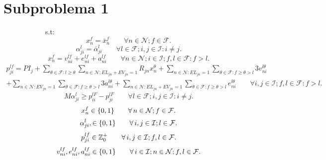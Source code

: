 \documentclass[authoryear,preprint,review,12pt]{elsarticle}
\begin{document}
\section{Subproblema 1}
~~~~~~~~~~~~s.t:
\begin{equation}\label{x_sp1}
x_n^f= \bar{x}_n^f \qquad \forall n \in \mathcal{N}; f \in \mathcal{F}.
\end{equation}
\begin{equation}\label{alpha-sp1}
\alpha_{ji}^l = \bar{\alpha}_{ji}^l \qquad \forall l \in \mathcal{F}; i,j \in \mathcal{I}: i \neq j.
\end{equation}
\begin{equation}\label{ecua7}
 x_n^f = v_{ni}^{lf} + e_{ni}^{lf} + a_{ni}^{lf} \qquad \forall n \in \mathcal{N}; i \in \mathcal{I}; f,l \in \mathcal{F}: f > l.
\end{equation}
\begin{multline}\label{ecua9}
  p_{ji}^{lf} = PI_j + \sum_{\theta \in  \mathcal{F}: l \geq \theta}\sum\limits_{n \in \mathcal{N}: EL_{jn}+EV_{jn}=1}R_{jn}x_n^\theta + \sum\limits_{n \in \mathcal{N}: EL_{jn}=1}\sum\limits_{\theta \in \mathcal{F}: f \geq \theta > l}3v_{ni}^{l\theta} \\
  + \sum\limits_{n \in \mathcal{N}: EV_{jn}=1}\sum\limits_{\theta \in \mathcal{F}: f \geq \theta > l}3a_{ni}^{l\theta} + \sum\limits_{n \in \mathcal{N}: EL_{jn}+ EV_{jn}=1}\sum\limits_{\theta \in \mathcal{F}: f \geq \theta > l}e_{ni}^{l\theta} \qquad \forall i,j \in \mathcal{I}; f,l \in \mathcal{F}: f > l.
\end{multline}
\begin{equation}\label{ecua11}
   M\alpha_{ji}^l \geq p_{ii}^{lF} - p_{ji}^{lF} \qquad \forall l \in \mathcal{F}; i,j \in \mathcal{I}: i \neq j.
\end{equation}
\begin{equation}\label{ecua29_sp1}
  x_n^f \in\{0,1\} \qquad \forall\, n \in \mathcal{N}; f \in \mathcal{F}.\\
\end{equation}
\begin{equation}\label{ecua33_sp1}
  \alpha_{ji}^l, \in \{0,1\} \qquad \forall\, i,j \in \mathcal{I}; l \in \mathcal{F}.\\
\end{equation}
\begin{equation}\label{ecua31}
  p_{ji}^{lf} \in \mathbb{Z}^+_0 \qquad \forall\, i,j \in \mathcal{I}; f,l \in \mathcal{F}.\\
\end{equation}
\begin{equation}\label{ecua32}
  v_{ni}^{lf}, e_{ni}^{lf}, a_{ni}^{lf} \in \{0,1\} \qquad \forall\, i \in \mathcal{I}; n \in \mathcal{N}; f,l \in \mathcal{F}.\\
\end{equation}
\end{document}
